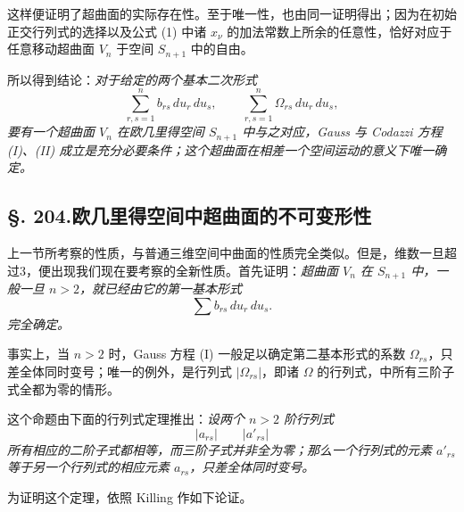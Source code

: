 这样便证明了超曲面的实际存在性。至于唯一性，也由同一证明得出；因为在初始正交行列式的选择以及公式 (1) 中诸 $x_\nu$ 的加法常数上所余的任意性，恰好对应于任意移动超曲面 $V_n$ 于空间 $S_{n+1}$ 中的自由。

所以得到结论：\emph{对于给定的两个基本二次形式}
\[
\sum_{r,s=1}^{n} b_{rs}\,du_r\,du_s,\qquad
\sum_{r,s=1}^{n} \Omega_{rs}\,du_r\,du_s,
\]
\emph{要有一个超曲面 $V_n$ 在欧几里得空间 $S_{n+1}$ 中与之对应，Gauss 与 Codazzi 方程 (I)、(II) 成立是充分必要条件；这个超曲面在相差一个空间运动的意义下唯一确定。}

\subsection*{\S. 204.\quad 欧几里得空间中超曲面的不可变形性}

上一节所考察的性质，与普通三维空间中曲面的性质完全类似。但是，维数一旦超过3，便出现我们现在要考察的全新性质。首先证明：\emph{超曲面 $V_n$ 在 $S_{n+1}$ 中，一般一旦 $n>2$，就已经由它的第一基本形式}
\[
\sum b_{rs}\,du_r\,du_s.
\]
\emph{完全确定。}

事实上，当 $n>2$ 时，Gauss 方程 (I) 一般足以确定第二基本形式的系数 $\Omega_{rs}$，只差全体同时变号；唯一的例外，是行列式 $|\Omega_{rs}|$，即诸 $\Omega$ 的行列式，中所有三阶子式全都为零的情形。

这个命题由下面的行列式定理推出：\emph{设两个 $n>2$ 阶行列式}
\[
|a_{rs}|\qquad |a'_{rs}|
\]
\emph{所有相应的二阶子式都相等，而三阶子式并非全为零；那么一个行列式的元素 $a'_{rs}$ 等于另一个行列式的相应元素 $a_{rs}$，只差全体同时变号。}

为证明这个定理，依照 Killing 作如下论证。

